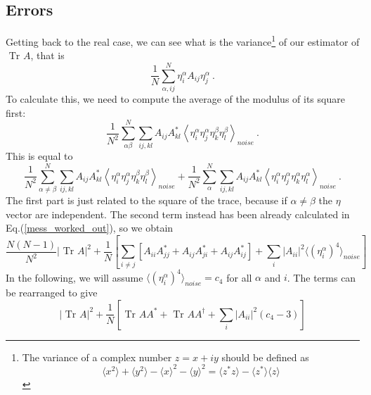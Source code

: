 \subsection{Errors}
Getting back to the real case, we can see what is the variance\footnote{
The variance of a complex number $ z = x + i y$ should be defined as
\[
 \langle x^2 \rangle + \langle y^2 \rangle - \langle x \rangle ^2 - \langle y 
\rangle^2 = \langle z^\ast z \rangle  - \langle z^\ast \rangle  \langle z 
\rangle 
\]
} of 
our estimator of $\mbox { Tr } A $, that is
\begin{equation}
 \label{trace_estimator}
 \frac{1}{N} \sum^N_{\alpha,ij}  \eta^\alpha_i A_{ij} \eta^\alpha_j \ .
\end{equation}
To calculate this, we need to compute the average of the modulus of its square 
first:
\begin{equation}
 \frac{1}{N^2} \sum^N_{\alpha\beta} \sum_{ij,kl} A_{ij} A^\ast_{kl}
 \left\langle \eta^\alpha_i \eta^\alpha_j  \eta^\beta_k \eta^\beta_l 
\right\rangle_{noise}  \ .
\end{equation}
This is equal to
\begin{equation}
 \frac{1}{N^2} \sum^N_{\alpha \neq \beta} \sum_{ij,kl} A_{ij} A^\ast_{kl}
 \left\langle \eta^\alpha_i \eta^\alpha_j  \eta^\beta_k \eta^\beta_l 
\right\rangle_{noise} +  \frac{1}{N^2} \sum^N_{\alpha} \sum_{ij,kl} 
A_{ij} A^\ast_{kl}
 \left\langle \eta^\alpha_i \eta^\alpha_j  \eta^\alpha_k \eta^\alpha_l 
\right\rangle_{noise}   \ .
\end{equation}
The first part is just related to the square of the trace, because if $\alpha 
\neq \beta$ the $\eta$ vector are independent. The second term instead has been 
already calculated in Eq.(\ref{mess_worked_out}), so we obtain
\begin{equation}
\frac{N(N-1)}{N^2} \left|\mbox{ Tr }  A \right|^2 + \frac{1}{N} \left[
\sum_{i \neq j} \left[ A_{ii} A^\ast_{jj} + A_{ij} A^\ast_{ji} + A_{ij} 
A^\ast_{ij}\right] + \sum_{i} \left|A_{ii}\right|^2 \langle 
\left(\eta_i^\alpha\right)^4 \rangle_{noise} \right]
\end{equation}
In the following, we will assume $\langle 
\left(\eta_i^\alpha\right)^4 \rangle_{noise} = c_4 $ for all $\alpha$ and $i$. 
The terms can be rearranged to give
\begin{equation}
\left|\mbox{ Tr }  A \right|^2 + \frac{1}{N} \left[
\mbox{ Tr } A A^\ast + \mbox{ Tr } A A^\dagger 
+ \sum_{i} \left|A_{ii}\right|^2 \left(c_4 -3 \right) \right]
\end{equation}
